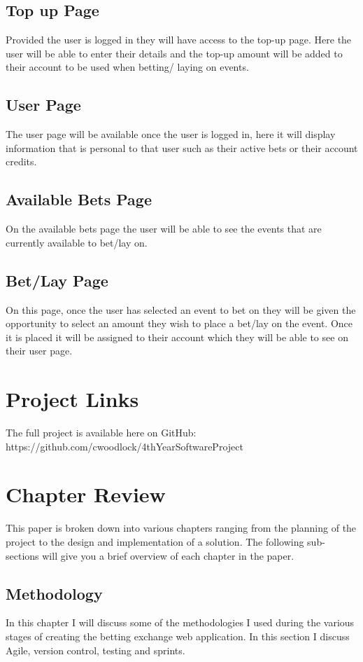 \subsection{Top up Page}
Provided the user is logged in they will have access to the top-up page. Here the user will be able to enter their details and the top-up amount will be added to their account to be used when betting/ laying on events.

\subsection{User Page}
The user page will be available once the user is logged in, here it will display information that is personal to that user such as their active bets or their account credits.

\subsection{Available Bets Page}
On the available bets page the user will be able to see the events that are currently available to bet/lay on. 

\subsection{Bet/Lay Page}
On this page, once the user has selected an event to bet on they will be given the opportunity to select an amount they wish to place a bet/lay on the event. Once it is placed it will be assigned to their account which they will be able to see on their user page.

\section{Project Links}
The full project is available here on GitHub:
https://github.com/cwoodlock/4thYearSoftwareProject

\section{Chapter Review}
This paper is broken down into various chapters ranging from the planning of the project to the design and implementation of a solution. The following sub-sections will give you a brief overview of each chapter in the paper.

\subsection{Methodology}
In this chapter I will discuss some of the methodologies I used during the various stages of creating the betting exchange web application. In this section I discuss Agile, version control, testing and sprints.

